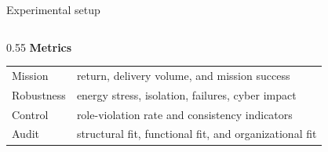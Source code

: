 \documentclass[aspectratio=169]{beamer}
\begin{document}
\begin{frame}{Experimental setup}
\begin{columns}[c,totalwidth=\textwidth]
\begin{column}{0.55\textwidth}
      \vspace{0.32cm}
      \textbf{Metrics}
      \begin{tabularx}{\linewidth}{p{1.2cm} X}
        \toprule
        Mission    & return, delivery volume, and mission success           \\
        Robustness & energy stress, isolation, failures, cyber impact       \\
        Control    & role-violation rate and consistency indicators         \\
        Audit      & structural fit, functional fit, and organizational fit \\
        \bottomrule
      \end{tabularx}
    \end{column}
  \end{columns}

\end{frame}
\end{document}
